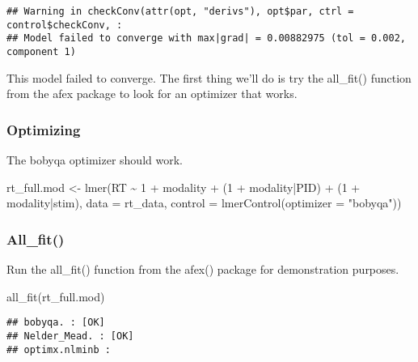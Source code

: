 \documentclass[
]{article}
\newenvironment{Shaded}{\begin{snugshade}}{\end{snugshade}}
\newcommand{\AttributeTok}[1]{\textcolor[rgb]{0.77,0.63,0.00}{#1}}
\newcommand{\DecValTok}[1]{\textcolor[rgb]{0.00,0.00,0.81}{#1}}
\newcommand{\FunctionTok}[1]{\textcolor[rgb]{0.00,0.00,0.00}{#1}}
\newcommand{\NormalTok}[1]{#1}
\newcommand{\OtherTok}[1]{\textcolor[rgb]{0.56,0.35,0.01}{#1}}
\newcommand{\SpecialCharTok}[1]{\textcolor[rgb]{0.00,0.00,0.00}{#1}}
\newcommand{\StringTok}[1]{\textcolor[rgb]{0.31,0.60,0.02}{#1}}
\begin{document}
\begin{verbatim}
## Warning in checkConv(attr(opt, "derivs"), opt$par, ctrl = control$checkConv, :
## Model failed to converge with max|grad| = 0.00882975 (tol = 0.002, component 1)
\end{verbatim}

This model failed to converge. The first thing we'll do is try the
all\_fit() function from the afex package to look for an optimizer that
works.

\hypertarget{optimizing}{%
\subsubsection{Optimizing}\label{optimizing}}

The bobyqa optimizer should work.

\begin{Shaded}
\begin{Highlighting}[]
\NormalTok{rt\_full.mod }\OtherTok{\textless{}{-}} \FunctionTok{lmer}\NormalTok{(RT }\SpecialCharTok{\textasciitilde{}} \DecValTok{1} \SpecialCharTok{+}\NormalTok{ modality }\SpecialCharTok{+} 
\NormalTok{                      (}\DecValTok{1} \SpecialCharTok{+}\NormalTok{ modality}\SpecialCharTok{|}\NormalTok{PID) }\SpecialCharTok{+}\NormalTok{ (}\DecValTok{1} \SpecialCharTok{+}\NormalTok{ modality}\SpecialCharTok{|}\NormalTok{stim), }
                    \AttributeTok{data =}\NormalTok{ rt\_data, }
                    \AttributeTok{control =} \FunctionTok{lmerControl}\NormalTok{(}\AttributeTok{optimizer =} \StringTok{"bobyqa"}\NormalTok{))}
\end{Highlighting}
\end{Shaded}

\hypertarget{all_fit}{%
\subsubsection{All\_fit()}\label{all_fit}}

Run the all\_fit() function from the afex() package for demonstration
purposes.

\begin{Shaded}
\begin{Highlighting}[]
\FunctionTok{all\_fit}\NormalTok{(rt\_full.mod)}
\end{Highlighting}
\end{Shaded}

\begin{verbatim}
## bobyqa. : [OK]
## Nelder_Mead. : [OK]
## optimx.nlminb :
\end{verbatim}
\end{document}
